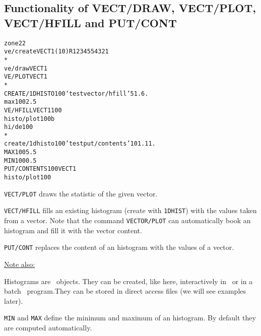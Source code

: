 \subsection*{Functionality of VECT/DRAW, VECT/PLOT, VECT/HFILL and
  PUT/CONT}
\begin{alltt}
      zone 2 2
      ve/create VECT1(10) R 1 2 3 4 5 5 4 3 2 1
      *
      ve/draw VECT1
     VE/PLOT VECT1
      *
     CREATE/1DHISTO 100 'test vector/hfill' 5 1. 6.
      max 100 2.5
     VE/HFILL VECT1 100
      histo/plot 100 b
      hi/de 100
      *
      create/1dhisto 100 'test put/contents' 10 1. 11.
     MAX 100 5.5
     MIN 100 0.5
     PUT/CONTENTS 100 VECT1
      histo/plot 100
\end{alltt} 
\begin{DinglistE}
\item {\tt VECT/PLOT} draws the statistic of the given vector.
\item {\tt VECT/HFILL} fills an existing histogram (create with
      {\tt 1DHIST}) with the values taken from a vector. Note that the
      command {\tt VECTOR/PLOT} can automatically book an histogram
      and fill it with the vector content.
\item {\tt PUT/CONT} replaces the content of an histogram with
     the values of a vector.

\underline{Note also:}

\item Histograms are \HBOOK\ objects. They can be created, like here,
      interactively in \PAW\ or in a batch \HBOOK\ program.They can be 
      stored in direct access files (we will see examples later).
\item {\tt MIN} and {\tt MAX} define the minimum and maximum of
      an histogram. By default they are computed automatically.
\end{DinglistE}

\clearpage

